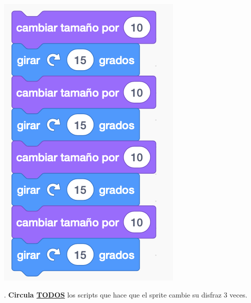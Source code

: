 \documentclass[letterpaper,12pt]{article}
\begin{document}
\includegraphics[scale=.6,valign=t]{q2_script4.png} \hspace{1.25cm}

\noindent \dotfill

. \textbf{Circula \underline{TODOS}} los scripts que hace que el sprite cambie su disfraz 3 veces.  \\
\end{document}
